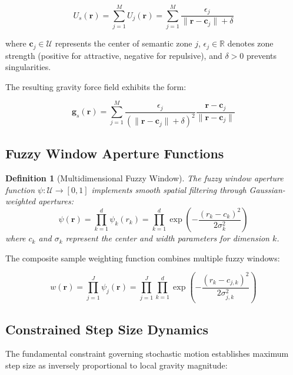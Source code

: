 \documentclass[11pt,a4paper]{article}
\newtheorem{definition}[theorem]{Definition}
\begin{document}
\begin{equation}
U_s(\mathbf{r}) = \sum_{j=1}^M U_j(\mathbf{r}) = \sum_{j=1}^M \frac{\epsilon_j}{\|\mathbf{r} - \mathbf{c}_j\| + \delta}
\label{eq:semantic-potential}
\end{equation}

where $\mathbf{c}_j \in \mathcal{U}$ represents the center of semantic zone $j$, $\epsilon_j \in \mathbb{R}$ denotes zone strength (positive for attractive, negative for repulsive), and $\delta > 0$ prevents singularities.

The resulting gravity force field exhibits the form:

\begin{equation}
\mathbf{g}_s(\mathbf{r}) = \sum_{j=1}^M \frac{\epsilon_j}{(\|\mathbf{r} - \mathbf{c}_j\| + \delta)^2} \frac{\mathbf{r} - \mathbf{c}_j}{\|\mathbf{r} - \mathbf{c}_j\|}
\label{eq:gravity-force}
\end{equation}

\subsection{Fuzzy Window Aperture Functions}

\begin{definition}[Multidimensional Fuzzy Window]
The fuzzy window aperture function $\psi: \mathcal{U} \to [0,1]$ implements smooth spatial filtering through Gaussian-weighted apertures:
\begin{equation}
\psi(\mathbf{r}) = \prod_{k=1}^d \psi_k(r_k) = \prod_{k=1}^d \exp\left(-\frac{(r_k - c_k)^2}{2\sigma_k^2}\right)
\label{eq:fuzzy-window}
\end{equation}
where $c_k$ and $\sigma_k$ represent the center and width parameters for dimension $k$.
\end{definition}

The composite sample weighting function combines multiple fuzzy windows:

\begin{equation}
w(\mathbf{r}) = \prod_{j=1}^J \psi_j(\mathbf{r}) = \prod_{j=1}^J \prod_{k=1}^d \exp\left(-\frac{(r_k - c_{j,k})^2}{2\sigma_{j,k}^2}\right)
\label{eq:composite-weight}
\end{equation}

\subsection{Constrained Step Size Dynamics}

The fundamental constraint governing stochastic motion establishes maximum step size as inversely proportional to local gravity magnitude:
\end{document}
